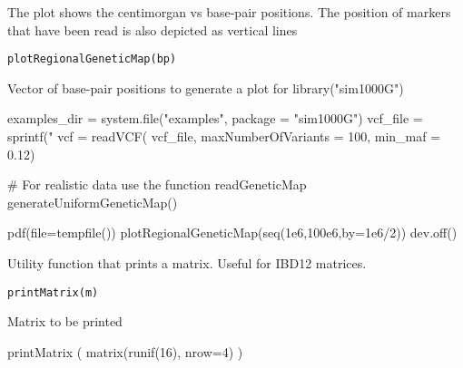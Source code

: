 \documentclass[letterpaper]{book}
\begin{document}
%
\begin{Description}\relax
The plot shows the centimorgan vs base-pair positions.
The position of markers that have been read is also depicted as vertical lines
\end{Description}
%
\begin{Usage}
\begin{verbatim}
plotRegionalGeneticMap(bp)
\end{verbatim}
\end{Usage}
%
\begin{Arguments}
\begin{ldescription}
\item[\code{bp}] Vector of base-pair positions to generate a plot for
library("sim1000G")

examples\_dir = system.file("examples", package = "sim1000G")
vcf\_file = sprintf("
vcf = readVCF( vcf\_file, maxNumberOfVariants = 100,
min\_maf = 0.12)

\# For realistic data use the function readGeneticMap
generateUniformGeneticMap()

pdf(file=tempfile())
plotRegionalGeneticMap(seq(1e6,100e6,by=1e6/2))
dev.off()
\end{ldescription}
\end{Arguments}
%
\begin{Description}\relax
Utility function that prints a matrix. Useful for IBD12 matrices.
\end{Description}
%
\begin{Usage}
\begin{verbatim}
printMatrix(m)
\end{verbatim}
\end{Usage}
%
\begin{Arguments}
\begin{ldescription}
\item[\code{m}] Matrix to be printed
\end{ldescription}
\end{Arguments}
%
\begin{Examples}
\begin{ExampleCode}

printMatrix (  matrix(runif(16), nrow=4) )
\end{ExampleCode}
\end{Examples}
\end{document}
